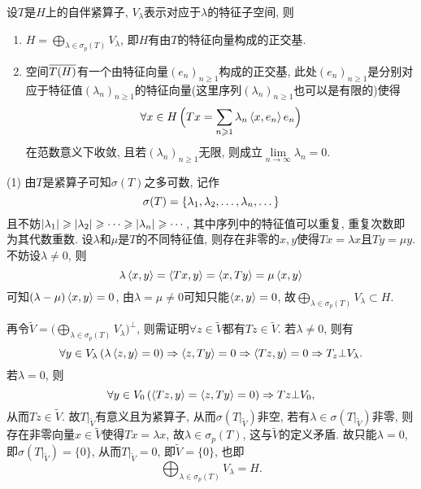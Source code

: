 	\begin{Theorem}[自伴紧算子的谱分解]\label{thm:自伴紧算子的谱分解}
	设$ T $是$ H $上的自伴紧算子, $ V_\lambda $表示对应于$ \lambda $的特征子空间, 则
	\begin{enumerate}[(1)]
	\item $ H=\bigoplus\limits_{\lambda\in\sigma_p(T)}V_\lambda $, 即$ H $有由$ T $的特征向量构成的正交基.
	\item 空间$ \baro{T(H)} $有一个由特征向量$ (e_n)_{n\geqslant 1} $构成的正交基, 此处$ (e_n)_{n\geqslant 1} $是分别对应于特征值$ (\lambda_n)_{n\geqslant 1} $的特征向量(这里序列$ (\lambda_n)_{n\geqslant 1} $也可以是有限的)使得
	\[
	\forall x\in H\,\Big(Tx=\sum_{n\geqslant 1}\lambda_n\lrangle{x,e_n}e_n\Big)
	\]
	在范数意义下收敛, 且若$ (\lambda_n)_{n\geqslant 1} $无限, 则成立$ \lim\limits_{n\to\infty}\lambda_n=0 $.
	\end{enumerate}
	\end{Theorem}
	\begin{Proof}
	(1) 由$ T $是紧算子可知$ \sigma(T) $之多可数, 记作
	\[
	\sigma(T)=\{ \seq{\lambda},\dots \}
	\]
	且不妨$ \abs{\lambda_1}\geqslant\abs{\lambda_2}\geqslant\cdots\geqslant\abs{\lambda_n}\geqslant\cdots $, 其中序列中的特征值可以重复, 重复次数即为其代数重数. 设$ \lambda $和$ \mu $是$ T $的不同特征值, 则存在非零的$ x,y $使得$ Tx=\lambda x $且$ Ty=\mu y $. 不妨设$ \lambda\ne 0 $, 则
	\[
	\lambda\lrangle{x,y}=\lrangle{Tx,y}=\lrangle{x,Ty}=\mu\lrangle{x,y}
	\]
	可知$ (\lambda-\mu)\lrangle{x,y}=0 $, 由$ \lambda=\mu\ne0 $可知只能$ \lrangle{x,y}=0 $, 故$ \bigoplus\limits_{\lambda\in\sigma_p(T)}V_\lambda\subset H $.
	
	再令$ \tilde{V}=\Big(\bigoplus\limits_{\lambda\in\sigma_p(T)}V_\lambda\Big)^\bot $, 则需证明$ \forall z\in\tilde{V} $都有$ Tz\in\tilde{V} $. 若$ \lambda\ne 0 $, 则有
	\[
	\forall y\in V_\lambda\,(\lambda\lrangle{z,y}=0)\Rightarrow\lrangle{z,Ty}=0\Rightarrow\lrangle{Tz,y}=0\Rightarrow T_z\bot V_\lambda.
	\]
	若$ \lambda=0 $, 则
	\[
	\forall y\in V_0\,(\lrangle{Tz,y}=\lrangle{z,Ty}=0)\Rightarrow Tz\bot V_0,
	\]
	从而$ Tz\in\tilde{V} $. 故$ T|_{\tilde V} $有意义且为紧算子, 从而$ \sigma(T|_{\tilde V}) $非空, 若有$ \lambda\in\sigma(T|_{\tilde V}) $非零, 则存在非零向量$ x\in\tilde{V} $使得$ Tx=\lambda x $, 故$ \lambda\in\sigma_p(T) $, 这与$ \tilde{V} $的定义矛盾. 故只能$ \lambda=0 $, 即$ \sigma(T|_{\tilde{V}})=\{0\} $, 从而$ T|_{\tilde V}=0 $, 即$ \tilde{V}=\{0\} $, 也即
	\[
	\bigoplus_{\lambda\in\sigma_p(T)}V_\lambda=H.
	\]
	\end{Proof}